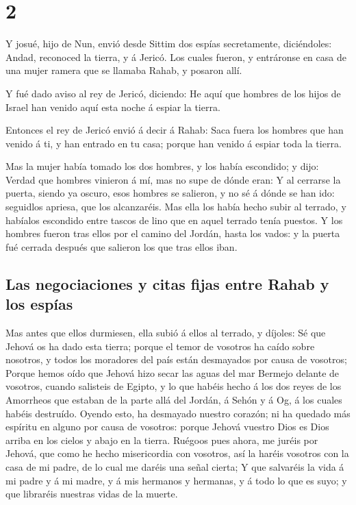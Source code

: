 \hypertarget{section-1}{%
\section{2}\label{section-1}}

 Y josué, hijo de Nun, envió desde Sittim dos espías
secretamente, diciéndoles: Andad, reconoced la tierra, y á Jericó. Los
cuales fueron, y entráronse en casa de una mujer ramera que se llamaba
Rahab, y posaron allí.

 Y fué dado aviso al rey de Jericó, diciendo: He aquí que
hombres de los hijos de Israel han venido aquí esta noche á espiar la
tierra.

 Entonces el rey de Jericó envió á decir á Rahab: Saca fuera
los hombres que han venido á ti, y han entrado en tu casa; porque han
venido á espiar toda la tierra.

 Mas la mujer había tomado los dos hombres, y los había
escondido; y dijo: Verdad que hombres vinieron á mí, mas no supe de
dónde eran:  Y al cerrarse la puerta, siendo ya oscuro, esos
hombres se salieron, y no sé á dónde se han ido: seguidlos apriesa, que
los alcanzaréis.  Mas ella los había hecho subir al terrado,
y habíalos escondido entre tascos de lino que en aquel terrado tenía
puestos.  Y los hombres fueron tras ellos por el camino del
Jordán, hasta los vados: y la puerta fué cerrada después que salieron
los que tras ellos iban.

\hypertarget{las-negociaciones-y-citas-fijas-entre-rahab-y-los-espuxedas}{%
\subsection{Las negociaciones y citas fijas entre Rahab y los
espías}\label{las-negociaciones-y-citas-fijas-entre-rahab-y-los-espuxedas}}

 Mas antes que ellos durmiesen, ella subió á ellos al
terrado, y díjoles:  Sé que Jehová os ha dado esta tierra;
porque el temor de vosotros ha caído sobre nosotros, y todos los
moradores del país están desmayados por causa de vosotros; 
Porque hemos oído que Jehová hizo secar las aguas del mar Bermejo
delante de vosotros, cuando salisteis de Egipto, y lo que habéis hecho á
los dos reyes de los Amorrheos que estaban de la parte allá del Jordán,
á Sehón y á Og, á los cuales habéis destruído.  Oyendo
esto, ha desmayado nuestro corazón; ni ha quedado más espíritu en alguno
por causa de vosotros: porque Jehová vuestro Dios es Dios arriba en los
cielos y abajo en la tierra.  Ruégoos pues ahora, me juréis
por Jehová, que como he hecho misericordia con vosotros, así la haréis
vosotros con la casa de mi padre, de lo cual me daréis una señal cierta;
 Y que salvaréis la vida á mi padre y á mi madre, y á mis
hermanos y hermanas, y á todo lo que es suyo; y que libraréis nuestras
vidas de la muerte.

